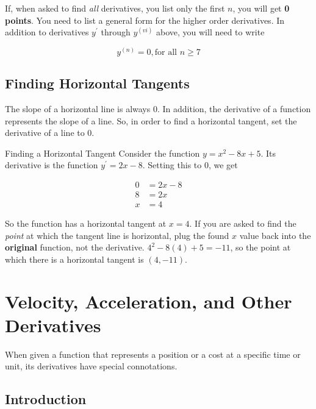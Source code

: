 \begin{tip}
    If, when asked to find \textit{all} derivatives, you list only the first \( n \), you will get \textbf{0 points}. You need to list a general form for the higher order derivatives. In addition to derivatives \( y^\prime \) through \( y^{(vi)} \) above, you will need to write
    
    \[ y^{(n)} = 0, \text{for all } n \ge 7 \]
\end{tip}

\subsection{Finding Horizontal Tangents}

The slope of a horizontal line is always \( 0 \). In addition, the derivative of a function represents the slope of a line. So, in order to find a horizontal tangent, set the derivative of a line to 0.

\begin{example}{Finding a Horizontal Tangent}
    Consider the function \( y = x^2 - 8x + 5 \). Its derivative is the function \( y^\prime = 2x - 8 \). Setting this to 0, we get
    
    \begin{align}
        0 &= 2x - 8 \\
        8 &= 2x \\
        x &= 4
    \end{align}
    
    So the function has a horizontal tangent at \( x = 4 \). If you are asked to find the \textit{point} at which the tangent line is horizontal, plug the found \( x \) value back into the \textbf{original} function, not the derivative. \( 4^2 - 8 \left( 4 \right) + 5 = -11 \), so the point at which there is a horizontal tangent is \( \left(4, -11 \right) \).
\end{example}

\section{Velocity, Acceleration, and Other Derivatives}

When given a function that represents a position or a cost at a specific time or unit, its derivatives have special connotations.

\subsection{Introduction}

